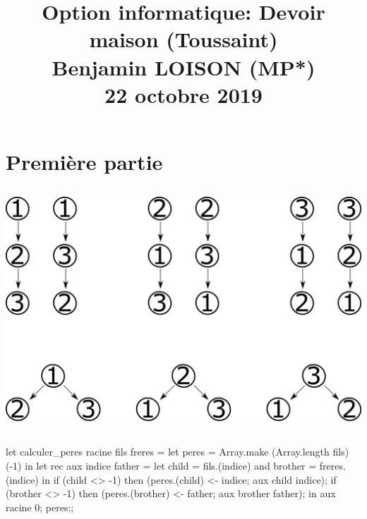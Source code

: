 \documentclass{article}
\begin{document}
	\obeylines

	\title{\vspace{-1.7cm}Option informatique: Devoir maison (Toussaint)\\
	\large Benjamin LOISON (MP*)
			\\22 octobre 2019}
	\date{}
	\maketitle

	\vspace{-2.3cm}\noindent\makebox[\linewidth]{\rule{\paperwidth}{0.4pt}}
	\vspace{4cm}\noindent\makebox[\linewidth]{\rule{\paperwidth}{0.4pt}}

	\section{Première partie}

		\setcounter{subsection}{16}
		\subsection{}

			\includegraphics[scale=0.1]{IMG/PNG/17.png}

		\subsection{}
		
			\begin{case}
let calculer_peres racine fils freres =
	let peres = Array.make (Array.length fils) (-1) in
		let rec aux indice father =
			let child = fils.(indice) and brother = freres.(indice) in
			if (child <> -1) then (peres.(child) <- indice; aux child indice);
			if (brother <> -1) then (peres.(brother) <- father; aux brother father);
		in aux racine 0;
	peres;;
			\end{case}
		
\end{document}
